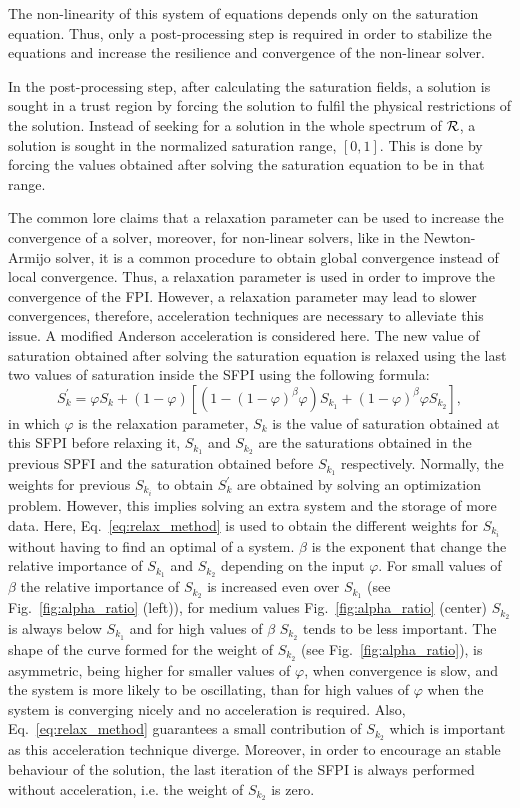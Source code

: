 The non-linearity of this system of equations depends only on the saturation equation. Thus, only a post-processing step is required in order to stabilize the equations and increase the resilience and convergence of the non-linear solver.

In the post-processing step, after calculating the saturation fields, a solution is sought in a trust region by forcing the solution to fulfil the physical restrictions of the solution. Instead of seeking for a solution in the whole spectrum of $\cal R$, a solution is sought in the normalized saturation range, $[0,1]$. This is done by forcing the values obtained after solving the saturation equation to be in that range.

The common lore claims that a relaxation parameter can be used to increase the convergence of a solver, moreover, for non-linear solvers, like in the Newton-Armijo solver, it is a common procedure to obtain global convergence instead of local convergence. Thus, a relaxation parameter is used in order to improve the convergence of the FPI. However, a relaxation parameter may lead to slower convergences, therefore, acceleration techniques are necessary to alleviate this issue. A modified Anderson acceleration is considered here.
The new value of saturation obtained after solving the saturation equation is relaxed using the last two values of saturation inside the SFPI using the following formula:
\begin{equation}
{S^\prime_k} = \varphi S_k + (1-\varphi) [ (1-(1-\varphi)^\beta \varphi) S_{k_1} + (1-\varphi)^\beta \varphi S_{k_2}],
\label{eq:relax_method}
\end{equation}
in which $\varphi$ is the relaxation parameter, $S_{k}$ is the value of saturation obtained at this SFPI before relaxing it, $S_{k_1}$ and $S_{k_2}$ are the saturations obtained in the previous SPFI and the saturation obtained before $S_{k_1}$ respectively.
Normally, the weights for previous $S_{k_i}$ to obtain ${S^\prime_k}$ are obtained by solving an optimization problem. However, this implies solving an extra system and the storage of more data.
Here, Eq.~\ref{eq:relax_method} is used to obtain the different weights for $S_{k_i}$ without having to find an optimal of a system.
$\beta$ is the exponent that change the relative importance of $S_{k_1}$ and $S_{k_2}$ depending on the input $\varphi$. For small values of $\beta$ the relative importance of $S_{k_2}$ is increased even over $S_{k_1}$ (see Fig.~\ref{fig:alpha_ratio} (left)), for medium values Fig.~\ref{fig:alpha_ratio} (center) $S_{k_2}$ is always below $S_{k_1}$ and for high values of $\beta$ $S_{k_2}$ tends to be less important. The shape of the curve formed for the weight of $S_{k_2}$ (see Fig.~\ref{fig:alpha_ratio}), is asymmetric, being higher for smaller values of $\varphi$, when convergence is slow, and the system is more likely to be oscillating, than for high values of $\varphi$ when the system is converging nicely and no acceleration is required. Also, Eq.~\ref{eq:relax_method} guarantees a small contribution of $S_{k_2}$ which is important as this acceleration technique diverge. Moreover, in order to encourage an stable behaviour of the solution, the last iteration of the SFPI is always performed without acceleration, i.e. the weight of $S_{k_2}$ is zero.


